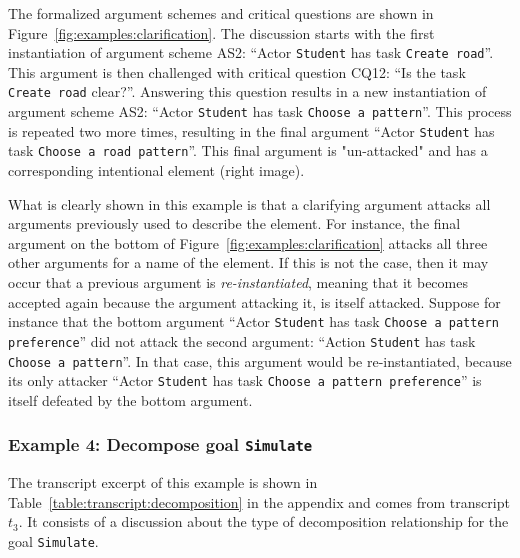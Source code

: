 The formalized argument schemes and critical questions are shown in Figure~\ref{fig:examples:clarification}. The discussion starts with the first instantiation of argument scheme AS2: ``Actor \texttt{Student} has task \texttt{Create road}''. 
This argument is then challenged with critical question CQ12: ``Is the task \texttt{Create road} clear?''. Answering this question results in a new instantiation of argument scheme AS2: ``Actor \texttt{Student} has task \texttt{Choose a pattern}''. %
This process is repeated two more times, resulting in the final argument ``Actor \texttt{Student} has task \texttt{Choose a road pattern}''. This final argument is "un-attacked" and has a corresponding intentional element (right image). 

What is clearly shown in this example is that a clarifying argument attacks all arguments previously used to describe the element. For instance, the final argument on the bottom of Figure~\ref{fig:examples:clarification} attacks all three other arguments for a name of the element. If this is not the case, then it may occur that a previous argument is \emph{re-instantiated}, meaning that it becomes accepted again because the argument attacking it, is itself attacked. Suppose for instance that the bottom argument ``Actor \texttt{Student} has task \texttt{Choose a pattern preference}'' did not attack the second argument: ``Action \texttt{Student} has task \texttt{Choose a pattern}''. In that case, this argument would be re-instantiated, because its only attacker ``Actor \texttt{Student} has task \texttt{Choose a pattern preference}'' is itself defeated by the bottom argument. %

\subsubsection{Example 4: Decompose goal \texttt{Simulate}} %

The transcript excerpt of this example is shown in Table~\ref{table:transcript:decomposition} in the appendix and comes from transcript $t_3$. It consists of a discussion about the type of decomposition relationship for the goal \texttt{Simulate}.

